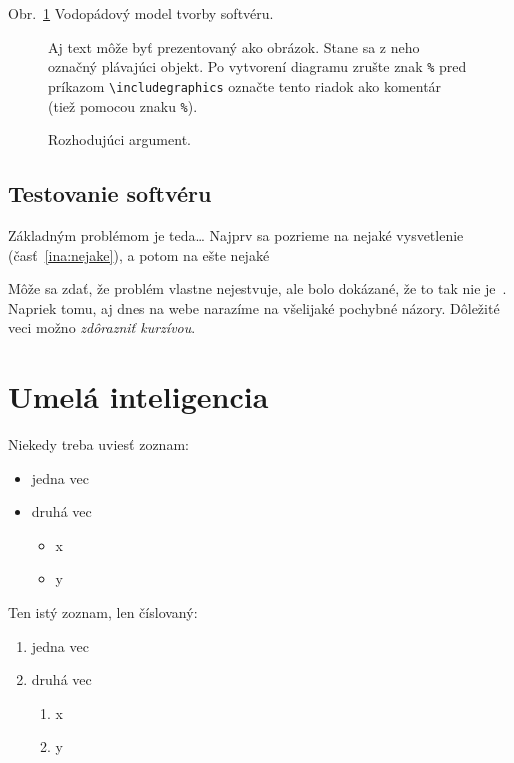 \documentclass[10pt,twoside,slovak,a4paper]{article}
\begin{document}
Obr.~\ref{f:rozhod} Vodopádový model tvorby softvéru.

\centering
\begin{figure}[tbh]
Aj text môže byť prezentovaný ako obrázok. Stane sa z neho označný plávajúci objekt. Po vytvorení diagramu zrušte znak \texttt{\%} pred príkazom \verb|\includegraphics| označte tento riadok ako komentár (tiež pomocou znaku \texttt{\%}).
\caption{Rozhodujúci argument.}
\label{f:rozhod}
\end{figure}

\subsection{Testovanie softvéru} \label{testovanie}

Základným problémom je teda\ldots{} Najprv sa pozrieme na nejaké vysvetlenie (časť~\ref{ina:nejake}), a potom na ešte nejaké %

Môže sa zdať, že problém vlastne nejestvuje\cite{Coplien:MPD}, ale bolo dokázané, že to tak nie je~\cite{Czarnecki:Staged, Czarnecki:Progress}. Napriek tomu, aj dnes na webe narazíme na všelijaké pochybné názory\cite{PLP-Framework}. Dôležité veci možno \emph{zdôrazniť kurzívou}.

\section{Umelá inteligencia}\label{AI}

Niekedy treba uviesť zoznam:

\begin{itemize}
\item jedna vec
\item druhá vec
	\begin{itemize}
	\item x
	\item y
	\end{itemize}
\end{itemize}

Ten istý zoznam, len číslovaný:

\begin{enumerate}
\item jedna vec
\item druhá vec
	\begin{enumerate}
	\item x
	\item y
	\end{enumerate}
\end{enumerate}
\end{document}
